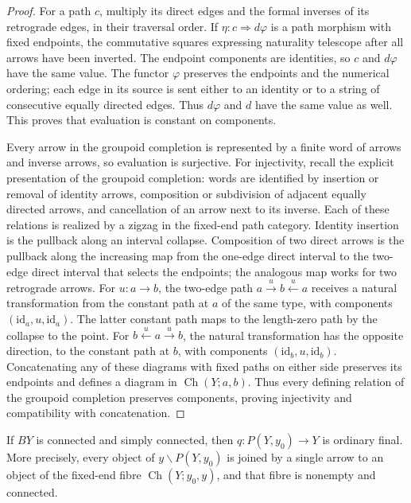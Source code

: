 \begin{proof}
For a path $c$, multiply its direct edges and the formal inverses of its retrograde edges, in their traversal order. If $\eta:c\Rightarrow d\varphi$ is a path morphism with fixed endpoints, the commutative squares expressing naturality telescope after all arrows have been inverted. The endpoint components are identities, so $c$ and $d\varphi$ have the same value. The functor $\varphi$ preserves the endpoints and the numerical ordering; each edge in its source is sent either to an identity or to a string of consecutive equally directed edges. Thus $d\varphi$ and $d$ have the same value as well. This proves that evaluation is constant on components.

Every arrow in the groupoid completion is represented by a finite word of arrows and inverse arrows, so evaluation is surjective. For injectivity, recall the explicit presentation of the groupoid completion: words are identified by insertion or removal of identity arrows, composition or subdivision of adjacent equally directed arrows, and cancellation of an arrow next to its inverse. Each of these relations is realized by a zigzag in the fixed-end path category. Identity insertion is the pullback along an interval collapse. Composition of two direct arrows is the pullback along the increasing map from the one-edge direct interval to the two-edge direct interval that selects the endpoints; the analogous map works for two retrograde arrows. For $u:a\to b$, the two-edge path $a\xrightarrow{u}b\xleftarrow{u}a$ receives a natural transformation from the constant path at $a$ of the same type, with components $(\mathrm{id}_a,u,\mathrm{id}_a)$. The latter constant path maps to the length-zero path by the collapse to the point. For $b\xleftarrow{u}a\xrightarrow{u}b$, the natural transformation has the opposite direction, to the constant path at $b$, with components $(\mathrm{id}_b,u,\mathrm{id}_b)$. Concatenating any of these diagrams with fixed paths on either side preserves its endpoints and defines a diagram in $\operatorname{Ch}(Y;a,b)$. Thus every defining relation of the groupoid completion preserves components, proving injectivity and compatibility with concatenation.
\end{proof}

\begin{proposition}\label{G:finality}
If $BY$ is connected and simply connected, then $q:P(Y,y_0)\to Y$ is ordinary final. More precisely, every object of $y\backslash P(Y,y_0)$ is joined by a single arrow to an object of the fixed-end fibre $\operatorname{Ch}(Y;y_0,y)$, and that fibre is nonempty and connected.
\end{proposition}

